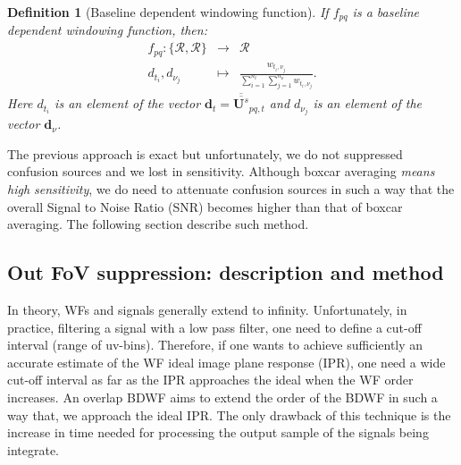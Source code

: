 \documentclass[useAMS,usenatbib]{mn2e}
\newtheorem{definition}[theorem]{Definition}
\begin{document}
\begin{definition}[Baseline dependent windowing function]
\label{def:3}
If $f_{pq}$ is a \textit{baseline dependent windowing function}, then:
\begin{eqnarray*}
 f_{pq}: \{\mathbf{\mathcal{R}},\mathbf{\mathcal{R}}\} &\rightarrow& \mathbf{\mathcal{R}}\\
                   d_{t_i},d_{\nu_j} &\mapsto& \frac{w_{t_i,\nu_j}}{\sum_{i=1}^{n_t}\sum_{j=1}^{n_{\nu}}w_{t_i,\nu_j}}.
\end{eqnarray*}
Here $d_{t_i}$ is an element of the vector $\mathbf{d}_{t}=\overline{\overline{\mathbf{U}^{s}}}_{pq,t}$ and $d_{\nu_j}$ is an element 
of the vector $\mathbf{d}^{}_{\nu}$.
\end{definition}
The previous approach is exact but unfortunately, we do not suppressed confusion sources and we lost in 
sensitivity. Although boxcar averaging \textit{means high sensitivity}, we do need to attenuate confusion sources in such a 
way that the overall Signal to Noise Ratio (SNR) becomes higher than that of boxcar averaging. The following section describe such 
method.
\subsection{Out FoV suppression: description and method}
\label{baseline2}
In theory, WFs and signals generally extend to  infinity. Unfortunately, in practice, filtering a signal with a low pass 
filter, one need to define a cut-off interval (range of uv-bins). Therefore, if one  wants to achieve sufficiently an accurate  estimate 
of the WF ideal image plane response (IPR), one need a wide cut-off interval as far as the IPR approaches 
the ideal when the WF order increases. An overlap BDWF aims to extend the order of the BDWF in 
such a way that, we approach the ideal IPR. The only drawback of this technique is the increase in time needed for processing the 
output sample of the signals being integrate.
\end{document}
